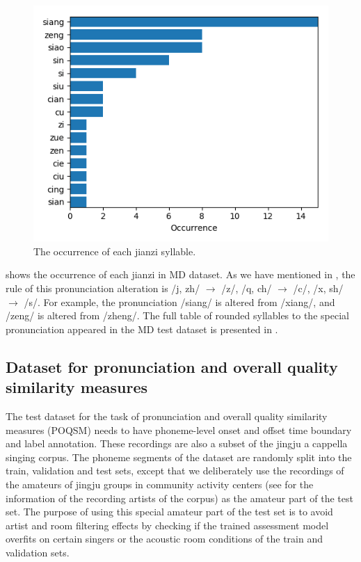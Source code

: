 \begin{figure}[ht!]
\includegraphics[width=\textwidth]{figs/dstats/occurrence_jianzi.png}
\caption{The occurrence of each jianzi syllable.}
\label{fig:ch4:occurrence_jianzi}
\end{figure}

 shows the occurrence of each \gls{jianzi} in MD dataset. As we have mentioned in , the rule of this pronunciation alteration is /j, zh/ $\rightarrow$ /z/, /q, ch/ $\rightarrow$ /c/, /x, sh/ $\rightarrow$ /s/. For example, the pronunciation /siang/ is altered from /xiang/, and /zeng/ is altered from /zheng/. The full table of rounded syllables to the special pronunciation appeared in the MD test dataset is presented in .

\subsection{Dataset for pronunciation and overall quality similarity measures}\label{sec:ch4:poqsm_dataset}

The test dataset for the task of pronunciation and overall quality similarity measures (POQSM) needs to have phoneme-level onset and offset time boundary and label annotation. These recordings are also a subset of the jingju a cappella singing corpus. The phoneme segments of the dataset are randomly split into the train, validation and test sets, except that we deliberately use the recordings of the amateurs of jingju groups in community activity centers (see  for the information of the recording artists of the corpus) as the amateur part of the test set. The purpose of using this special amateur part of the test set is to avoid artist and room filtering effects by checking if the trained assessment model overfits on certain singers or the acoustic room conditions of the train and validation sets.

